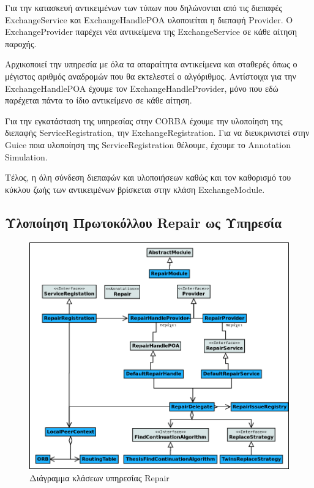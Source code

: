 Για την κατασκευή αντικειμένων των τύπων που δηλώνονται από τις διεπαφές 
ExchangeService και ExchangeHandlePOA υλοποιείται η διεπαφή Provider. Ο 
ExchangeProvider παρέχει νέα αντικείμενα της ExchangeService σε κάθε 
αίτηση παροχής. 

Αρχικοποιεί την υπηρεσία με όλα τα απαραίτητα αντικείμενα και σταθερές 
όπως ο μέγιστος αριθμός αναδρομών που θα εκτελεστεί ο αλγόριθμος. 
Αντίστοιχα για την ExchangeHandlePOA έχουμε τον ExchangeHandleProvider, 
μόνο που εδώ παρέχεται πάντα το ίδιο αντικείμενο σε κάθε αίτηση.

Για την εγκατάσταση της υπηρεσίας στην CORBA έχουμε την υλοποίηση της 
διεπαφής ServiceRegistration, την ExchangeRegistration. Για να 
διευκρινιστεί στην Guice ποια υλοποίηση της ServiceRegistration θέλουμε, 
έχουμε το Annotation Simulation.

Τέλος, η όλη σύνδεση διεπαφών και υλοποιήσεων καθώς και τον καθορισμό 
του κύκλου ζωής των αντικειμένων βρίσκεται στην κλάση ExchangeModule.

\subsection{Υλοποίηση Πρωτοκόλλου Repair ως Υπηρεσία}

\begin{figure}[htbp]
  \begin{center}
    \includegraphics[width=\textwidth]{Figures/Architecture/Service_Layer/RepairService_ClassDiagram.png}
  \end{center}
  \caption{Διάγραμμα κλάσεων υπηρεσίας Repair}
  \label{fig:RepairService}
\end{figure}

